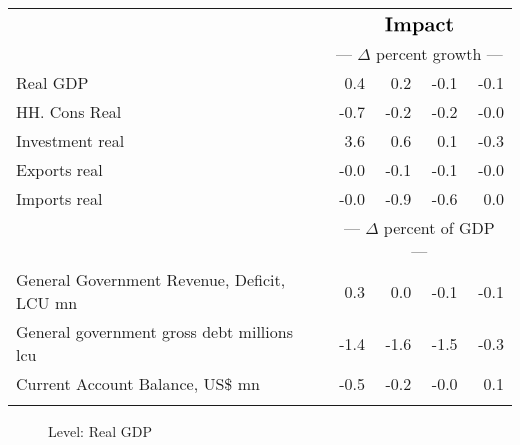 \documentclass{article}
\begin{document}
\begin{table}[ht]
\begin{tabular}{lrrr|r}
&\multicolumn{4}{c}{{ }}                                         \\
&\multicolumn{4}{c}{{$\Large \textbf{Impact}$}}                                         \\
&\multicolumn{4}{c}{{--- $\Delta$  percent growth ---}}                                         \\
Real GDP & 0.4 & 0.2 & -0.1 & -0.1 \\
HH. Cons Real & -0.7 & -0.2 & -0.2 & -0.0 \\
Investment real & 3.6 & 0.6 & 0.1 & -0.3 \\
Exports real & -0.0 & -0.1 & -0.1 & -0.0 \\
Imports real & -0.0 & -0.9 & -0.6 & 0.0 \\
&\multicolumn{4}{c}{{--- $\Delta$  percent of GDP ---}}                                         \\
General Government Revenue, Deficit, LCU mn & 0.3 & 0.0 & -0.1 & -0.1 \\
General government gross debt millions lcu & -1.4 & -1.6 & -1.5 & -0.3 \\
Current Account Balance, US\$ mn & -0.5 & -0.2 & -0.0 & 0.1 \\
&\multicolumn{4}{c}{{ }}                                         \\
\bottomrule
\end{tabular}
\end{table}
 
\begin{figure}[htbp]
\centering
\resizebox{\textwidth}{!}{}
\caption{Level: Real GDP}
\end{figure}
\end{document}
